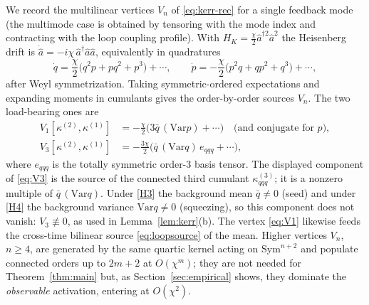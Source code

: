 \documentclass[11pt]{article}
\theoremstyle{remark}
\newcommand{\ahat}{\hat{a}}
\newcommand{\Var}{\mathrm{Var}}
\newcommand{\Sym}{\mathrm{Sym}}
\begin{document}
We record the multilinear vertices $V_n$ of \eqref{eq:kerr-rec} for a single
feedback mode (the multimode case is obtained by tensoring with the mode index
and contracting with the loop coupling profile). With
$H_K=\tfrac{\chi}{2}\ahat^{\dagger2}\ahat^2$ the Heisenberg drift is
$\dot{\ahat}=-i\chi\,\ahat^\dagger\ahat\ahat$, equivalently in quadratures
\[
\dot q=\frac{\chi}{2}\big(q^2p+pq^2+p^3\big)+\cdots,\qquad
\dot p=-\frac{\chi}{2}\big(p^2q+qp^2+q^3\big)+\cdots,
\]
after Weyl symmetrization. Taking symmetric-ordered expectations and expanding
moments in cumulants gives the order-by-order sources $V_n$. The two
load-bearing ones are
\begin{align}
V_1[\kappa^{(2)},\kappa^{(1)}]
&=-\frac{\chi}{2}\big(3\bar q\,(\Var p)+\cdots\big)\quad\text{(and conjugate for }p),
\label{eq:V1}\\
V_3[\kappa^{(2)},\kappa^{(1)}]
&=-\frac{3\chi}{2}\big(\bar q\,(\Var q)\,e_{qqq}+\cdots\big),
\label{eq:V3}
\end{align}
where $e_{qqq}$ is the totally symmetric order-3 basis tensor. The displayed
component of \eqref{eq:V3} is the source of the connected third cumulant
$\kappa^{(3)}_{qqq}$; it is a nonzero multiple of $\bar q\,(\Var q)$. Under
\ref{H3} the background mean $\bar q\neq0$ (seed) and under \ref{H4} the
background variance $\Var q\neq0$ (squeezing), so this component does not vanish:
$V_3\not\equiv0$, as used in Lemma~\ref{lem:kerr}(b). The vertex \eqref{eq:V1}
likewise feeds the cross-time bilinear source \eqref{eq:loopsource} of the mean.
Higher vertices $V_n$, $n\ge4$, are generated by the same quartic kernel acting on
$\Sym^{n+2}$ and populate connected orders up to $2m+2$ at $O(\chi^m)$; they are
not needed for Theorem~\ref{thm:main} but, as Section~\ref{sec:empirical} shows,
they dominate the \emph{observable} activation, entering at $O(\chi^2)$.




\end{document}
